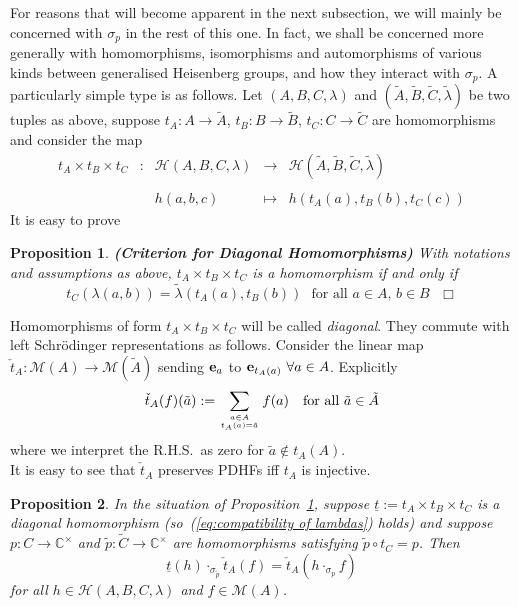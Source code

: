 \documentclass[12pt]{article}
\newtheorem{prop}{Proposition}[section]
\newcommand{\addwords}[1]{\ \ \ \mbox{#1}}
\newcommand{\bbC}{\ensuremath{\mathbb{C}}}\newcommand{\bbCp}{\ensuremath{\mathbb{C}_p}}
\newcommand{\be}{\ensuremath{{\bf e}}}
\newcommand{\cH}{\ensuremath{\mathcal{H}}}
\newcommand{\cM}{\mathcal{M}}
\newcommand{\displaymapdef}[5]
{
	\begin{array}{rcrcl}
		#1 &:& #2 &\longrightarrow& #3 \\
		& &    &                    \\
		& & #4 &\longmapsto    & #5
	\end{array}
}
\renewcommand{\rem}{\refstepcounter{rem}\noindent{\sc Remark \therem}}
\renewcommand{\t}[1]{\tilde{#1}}
\renewcommand{\therem}{\thesection.\arabic{rem}}
\newcommand{\Hei}[4]{\cH({#1},{#2},{#3},{#4})}
\newcommand{\HeiStan}{\Hei{A}{B}{C}{\lambda}}
\begin{document}
For reasons that will become apparent in the next subsection, we will mainly be concerned with $\sigma_p$ in the rest of this one.
In fact, we shall be concerned more generally with homomorphisms, isomorphisms and automorphisms of various kinds between generalised Heisenberg groups, and how they interact with $\sigma_p$. A particularly simple type is as follows. Let $(A,B,C,\lambda)$ and 
$({\t A},{\t B},{\t C},{\t \lambda})$ be two tuples as above, suppose $t_A:A\rightarrow {\t A}$, $t_B:B\rightarrow {\t B}$, $t_C:C\rightarrow {\t C}$ are homomorphisms and consider the map 
$$
\displaymapdef{t_A\times t_B\times t_C}{\HeiStan}{\cH({\t A},{\t B},{\t C},{\t \lambda})}
{h(a,b,c)}{h(t_A(a),t_B(b),t_C(c))}
$$
It is easy to prove
\begin{prop}\label{prop: criterion for diagonal homs}{\bf (Criterion for Diagonal Homomorphisms)}
	With notations and assumptions as above, 
	$t_A\times t_B\times t_C$ is a homomorphism if and only if 
	\begin{equation}\label{eq:compatibility of lambdas}
		t_C(\lambda(a,b))={\t \lambda}(t_A(a), t_B(b))\addwords{for all $a\in A$, $b\in B$\ \ \ \ \  \ \ $\Box$}
	\end{equation} 
\end{prop}
Homomorphisms of form $t_A\times t_B\times t_C$ will be called \textit{diagonal}. They commute  with left Schr\"odinger representations as follows.  Consider the linear map 
$\check t_A:\cM(A)\rightarrow \cM({\t A})$ sending $\be_a$ to $\be_{t_A(a)}\ \forall a\in A$. Explicitly 
\begin{equation}\label{eq:distribution relation}
	\check t_A(f)({\t a}):=\sum_{a\in A \atop  t_A(a)={\t a}}f(a)\addwords{for all ${\t a}\in {\t A}$}
\end{equation}
where we interpret the R.H.S.\ as zero for ${\t a}\nin t_A(A)$.\bigskip\\
\rem\label{rem:injectivity of tAstar} It is easy to see that $\check t_A$ preserves PDHFs iff $t_A$ is injective.
\begin{prop}\label{prop:"for future use"} In the situation of Proposition~\ref{prop: criterion for diagonal homs}, suppose $\underline{t}:=t_A\times t_B\times t_C$ is a diagonal homomorphism (so~(\ref{eq:compatibility of lambdas}) holds) and suppose $p:C\rightarrow\bbC^\times$ and ${\t p}:{\t C}\rightarrow\bbC^\times$ are homomorphisms satisfying ${\t p}\circ t_C=p$. Then  
	\begin{equation}\label{eq:actions commute with projection}
		\underline{t}(h)\cdot_{\sigma_{\t p}} \check t_A(f) = \check t_A (h\cdot_{\sigma_p} f)
	\end{equation} 
for all $h\in\HeiStan$ and $f\in\cM(A)$. 
\end{prop} 
\end{document}

